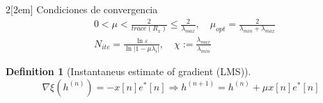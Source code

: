 \documentclass[leqno]{article}
\newtheorem*{definition}{Definition}
\begin{document}
\begin{multicols}{2}[\columnsep2em]
Condiciones de convergencia
\begin{align*}
& 0<\mu<\frac{2}{trace(R_x)}\le \frac{2}{\lambda_{max}}, \quad \mu_{opt}= \frac{2}{\lambda_{min}+\lambda_{max}}\\
& N_{ite} = \frac{\ln \varepsilon }{\ln|1-\mu\lambda_i|}, \quad \chi := \frac{\lambda_{max}}{\lambda_{min}}
\end{align*}

\begin{definition}[Instantaneus estimate of gradient (LMS)]
\[
\nabla \xi (h^{(n)}) = -x[n]e^*[n] \Rightarrow h^{(n+1)} = h^{(n)} + \mu x[n]e^*[n]
\] 
\end{definition}

\end{multicols}
\end{document}
